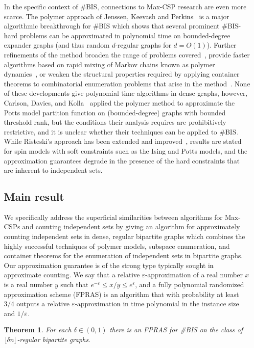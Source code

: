 \documentclass[11pt,letterpaper]{amsart}
\newtheorem{theorem}{Theorem}
\theoremstyle{definition}
\newcommand{\eps}{\varepsilon}
\begin{document}
In the specific context of \#BIS, connections to Max-CSP research are even more scarce.
The polymer approach of Jenssen, Keevash and Perkins~\cite{JKP19b} is a major algorithmic breakthrough for \#BIS which shows that several prominent \#BIS-hard problems can be approximated in polynomial time on bounded-degree expander graphs (and thus random $d$-regular graphs for $d=O(1)$). 
Further refinements of the method broaden the range of problems covered~\cite{GGS20,HJP23}, provide faster algorithms based on rapid mixing of Markov chains known as polymer dynamics~\cite{CGG+19}, or weaken the structural properties required by applying container theorems to combinatorial enumeration problems that arise in the method~\cite{CDF+22a,JPP22}. 
None of these developments give polynomial-time algorithms in dense graphs, however,
Carlson, Davies, and Kolla~\cite{CDK20} applied the polymer method to approximate the Potts model partition function on (bounded-degree) graphs with bounded threshold rank, but the conditions their analysis requires are prohibitively restrictive, and it is unclear whether their techniques can be applied to \#BIS.
While Risteski's approach has been extended and improved~\cite{JKR19,KLR22a}, results are stated for spin models with soft constraints such as the Ising and Potts models, and the approximation guarantees degrade in the presence of the hard constraints that are inherent to independent sets. 


\subsection{Main result}

We specifically address the superficial similarities between algorithms for Max-CSPs and counting independent sets by giving an algorithm for approximately counting independent sets in dense, regular bipartite graphs which combines the highly successful techniques of polymer models, subspace enumeration, and container theorems for the enumeration of independent sets in bipartite graphs. Our approximation guarantee is of the strong type typically sought in approximate counting. We say that a relative $\eps$-approximation of a real number $x$ is a real number $y$ such that $e^{-\eps} \le x/y \le e^{\eps}$, and a fully polynomial randomized approximation scheme (FPRAS) is an algorithm that with probability at least $3/4$ outputs a relative $\eps$-approximation in time polynomial in the instance size and $1/\eps$.

\begin{theorem}\label{thm:main}
    For each $\delta\in(0,1)$ there is an FPRAS for \#BIS on the class of $\lfloor \delta n\rfloor$-regular bipartite graphs.
\end{theorem}
\end{document}
